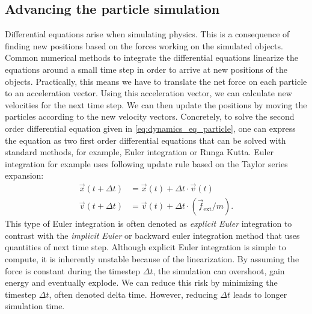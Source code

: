 \documentclass[\home/main.tex]{subfiles}
\begin{document}
\subsection{Advancing the particle simulation}
Differential equations arise when simulating physics. This is a consequence of finding new positions based on the forces working on the simulated objects. Common numerical methods to integrate the differential equations linearize the equations around a small time step in order to arrive at new positions of the objects.
Practically, this means we have to translate the net force on each particle to an acceleration vector. Using this acceleration vector, we can calculate new velocities for the next time step. We can then update the positions by moving the particles according to the new velocity vectors.
Concretely, to solve the second order differential equation given in \cref{eq:dynamics_eq_particle}, one can express the equation as two first order differential equations that can be solved with standard methods, for example, Euler integration or Runga Kutta. Euler integration for example uses following update rule based on the Taylor series expansion:
\begin{equation}
    \begin{aligned}
        \vec{x}(t+\Delta t) & =\vec{x}(t)+\Delta t \cdot \vec{v}(t)                 \\
        \vec{v}(t+\Delta t) & =\vec{v}(t)+\Delta t \cdot( \vec{f}_{\text{ext}} / m).
    \end{aligned}
\end{equation}
This type of Euler integration is often denoted as \emph{explicit Euler} integration to contrast with the \emph{implicit Euler} or backward euler integration method that uses quantities of next time step.
Although explicit Euler integration is simple to compute, it is inherently unstable because of the linearization. By assuming the force is constant during the timestep $\Delta t$, the simulation can overshoot, gain energy and eventually explode. We can reduce this risk by minimizing the timestep $\Delta t$, often denoted delta time. However, reducing $\Delta t$ leads to longer simulation time.

\end{document}
